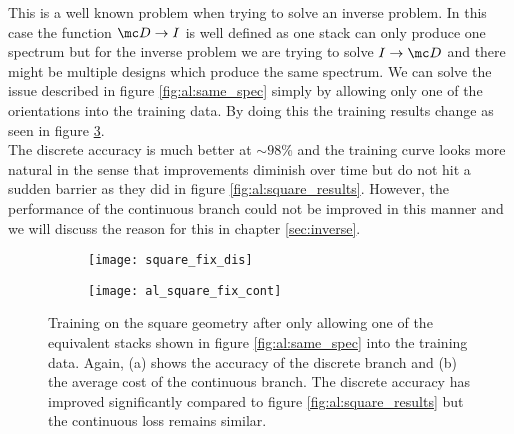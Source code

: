 \newpage
This is a well known problem when trying to solve an inverse problem. In this case the function $\mc D \rightarrow I$ is well defined as one stack can only produce one spectrum but for the inverse problem we are trying to solve $I \rightarrow \mc D$ and there might be multiple designs which produce the same spectrum. We can solve the issue described in figure \ref{fig:al:same_spec} simply by allowing only one of the orientations into the training data. By doing this the training  results change as seen in figure \ref{fig:al:squares_fix}.
\\

\indent
The discrete accuracy is much better at $\sim 98 \%$ and the training curve looks more natural in the sense that improvements diminish over time but do not hit a sudden barrier as they did in figure \ref{fig:al:square_results}. However, the performance of the continuous branch could not be improved in this manner and we will discuss the reason for this in chapter \ref{sec:inverse}.

\begin{figure}[H]
\centering
\begin{subfigure}{.5\textwidth}
    \centering
    \texttt{[image: square\_fix\_dis]}
    \caption{}
    \label{}
\end{subfigure}%
\begin{subfigure}{.5\textwidth}
    \centering
    \texttt{[image: al\_square\_fix\_cont]}
    \caption{}
    \label{}
\end{subfigure}
\caption{Training on the square geometry after only allowing one of the equivalent stacks shown in figure \ref{fig:al:same_spec} into the training data.
Again, (a) shows the accuracy of the discrete branch and (b) the average cost of the continuous branch. The discrete accuracy has improved significantly compared to figure \ref{fig:al:square_results} but the continuous loss remains similar.}
\label{fig:al:squares_fix}
\end{figure}

